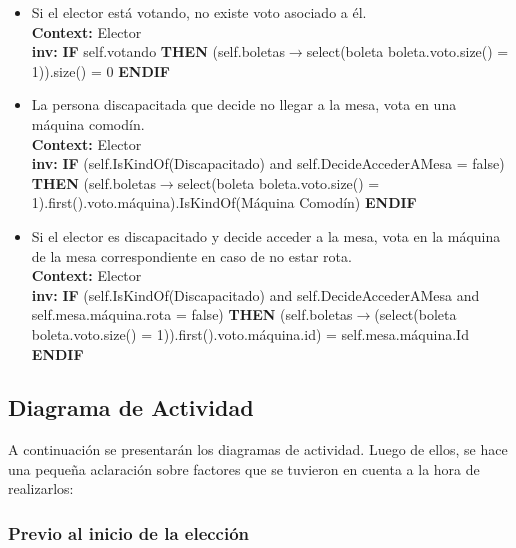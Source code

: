 \documentclass[spanish, 10pt,a4paper]{article}
\numberwithin{equation}{section} %
\begin{document}
\begin{itemize}
	\item Si el elector está votando, no existe voto asociado a él.
\\	\textbf{Context: }  Elector
\\	\textbf{inv: } \textbf{IF} self.votando \textbf{THEN} (self.boletas$\rightarrow$select(boleta \textbar boleta.voto.size() = 1)).size() = 0 \textbf{ENDIF}

	\item La persona discapacitada que decide no llegar a la mesa, vota en una máquina comodín.
\\	\textbf{Context: }  Elector
\\	\textbf{inv: } \textbf{IF} (self.IsKindOf(Discapacitado) and self.DecideAccederAMesa = false) \textbf{THEN} (self.boletas$\rightarrow$select(boleta \textbar boleta.voto.size() = 1).first().voto.máquina).IsKindOf(Máquina Comodín) \textbf{ENDIF}

	\item Si el elector es discapacitado y decide acceder a la mesa, vota en la máquina de la mesa correspondiente en caso de no estar rota.
\\	\textbf{Context: }  Elector
\\	\textbf{inv: } \textbf{IF} (self.IsKindOf(Discapacitado) and self.DecideAccederAMesa and self.mesa.máquina.rota = false) \textbf{THEN} (self.boletas$\rightarrow$(select(boleta \textbar boleta.voto.size() = 1)).first().voto.máquina.id) = self.mesa.máquina.Id \textbf{ENDIF}

\end{itemize}

\subsection{Diagrama de Actividad}
A continuación se presentarán los diagramas de actividad. Luego de ellos, se hace una pequeña aclaración sobre factores que se tuvieron en cuenta a la hora de realizarlos:

\subsubsection{Previo al inicio de la elección}
\end{document}

